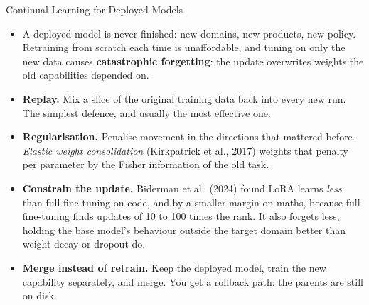 \begin{frame}[t,allowframebreaks]{Continual Learning for Deployed Models}
  \begin{itemize}\itemsep0.4em
    \item[\textcolor{red}{$\blacktriangleright$}] A deployed model is never finished: new domains, new products, new policy. Retraining from scratch each time is unaffordable, and tuning on only the new data causes \textbf{catastrophic forgetting}: the update overwrites weights the old capabilities depended on.
    \item[\textcolor{red}{$\blacktriangleright$}] \textbf{Replay.} Mix a slice of the original training data back into every new run. The simplest defence, and usually the most effective one.
    \item[\textcolor{red}{$\blacktriangleright$}] \textbf{Regularisation.} Penalise movement in the directions that mattered before. \emph{Elastic weight consolidation} (Kirkpatrick et al., 2017) weights that penalty per parameter by the Fisher information of the old task.
    \item[\textcolor{red}{$\blacktriangleright$}] \textbf{Constrain the update.} Biderman et al.\ (2024) found LoRA learns \emph{less} than full fine-tuning on code, and by a smaller margin on maths, because full fine-tuning finds updates of 10 to 100 times the rank. It also forgets less, holding the base model's behaviour outside the target domain better than weight decay or dropout do.
    \item[\textcolor{red}{$\blacktriangleright$}] \textbf{Merge instead of retrain.} Keep the deployed model, train the new capability separately, and merge. You get a rollback path: the parents are still on disk.
  \end{itemize}
\end{frame}
